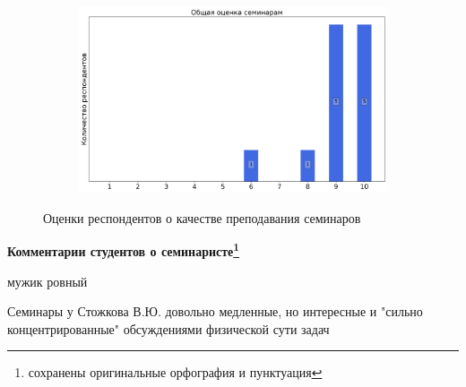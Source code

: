 \begin{figure}[H]
\begin{subfigure}[b]{0.45\textwidth}
			\end{subfigure}
			\begin{subfigure}[b]{0.45\textwidth}
				\centering
				\includegraphics[width=\textwidth]{images/1 course/Общая физика - механика/seminarists-marks-Стожков В.Ю.-3.png}
			\end{subfigure}	
			\caption{Оценки респондентов о качестве преподавания семинаров}
		\end{figure}

		\textbf{Комментарии студентов о семинаристе\protect\footnote{сохранены оригинальные орфография и пунктуация}}
            \begin{commentbox} 
                мужик ровный  
            \end{commentbox} 
        
            \begin{commentbox} 
                Семинары у Стожкова В.Ю. довольно медленные, но интересные и "сильно концентрированные" обсуждениями физической сути задач 
            \end{commentbox} 


